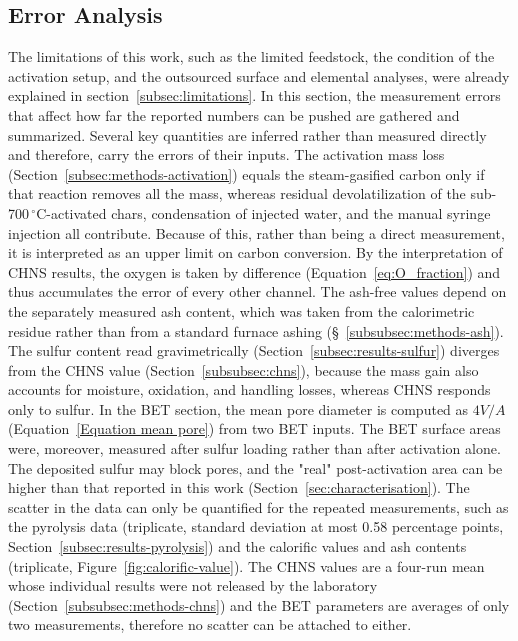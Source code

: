 \subsection{Error Analysis}
\label{subsec:error-analysis}
The limitations of this work, such as the limited feedstock, the condition of the activation setup, and the outsourced surface and elemental analyses, were already explained in section~\ref{subsec:limitations}. In this section, the measurement errors that affect how far the reported numbers can be pushed are gathered and summarized. Several key quantities are inferred rather than measured directly and therefore, carry the errors of their inputs. The activation mass loss (Section~\ref{subsec:methods-activation}) equals the steam-gasified carbon only if that reaction removes all the mass, whereas residual devolatilization of the sub-700\,$^{\circ}$C-activated chars, condensation of injected water, and the manual syringe injection all contribute. Because of this, rather than being a direct measurement, it is interpreted as an upper limit on carbon conversion. By the interpretation of CHNS results, the oxygen is taken by difference (Equation~\ref{eq:O_fraction}) and thus accumulates the error of every other channel. The ash-free values depend on the separately measured ash content, which was taken from the calorimetric residue rather than from a standard furnace ashing (\S~\ref{subsubsec:methods-ash}). The sulfur content read gravimetrically (Section~\ref{subsec:results-sulfur}) diverges from the CHNS value (Section~\ref{subsubsec:chns}), because the mass gain also accounts for moisture, oxidation, and handling losses, whereas CHNS responds only to sulfur. In the BET section, the mean pore diameter is computed as $4V/A$ (Equation~\ref{Equation mean pore}) from two BET inputs. The BET surface areas were, moreover, measured after sulfur loading rather than after activation alone. The deposited sulfur may block pores, and the "real" post-activation area can be higher than that reported in this work (Section~\ref{sec:characterisation}). The scatter in the data can only be quantified for the repeated measurements, such as the pyrolysis data (triplicate, standard deviation at most 0.58 percentage points, Section~\ref{subsec:results-pyrolysis}) and the calorific values and ash contents (triplicate, Figure~\ref{fig:calorific-value}). The CHNS values are a four-run mean whose individual results were not released by the laboratory (Section~\ref{subsubsec:methods-chns}) and the BET parameters are averages of only two measurements, therefore no scatter can be attached to either. 



